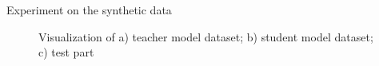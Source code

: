 \documentclass[12pt, aspectratio=169]{beamer}
\begin{document}
\begin{frame}{Experiment on the synthetic data}
\begin{figure}
\begin{minipage}[h]{0.3\linewidth}
    \end{minipage}
    \begin{minipage}[h]{0.3\linewidth}
    \end{minipage}
    \vspace{-0.2 cm}
    \caption*{\fontsize{8}{5}\selectfont
    Visualization of a) teacher model dataset; b) student model dataset; c) test part}
\end{figure}
\end{frame}
\end{document}
